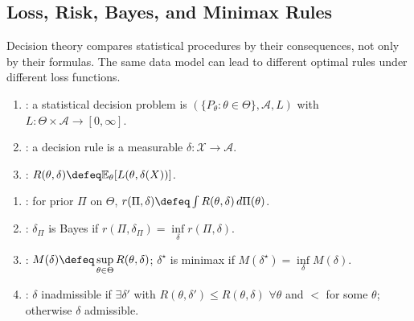 \subsection{Loss, Risk, Bayes, and Minimax Rules}

Decision theory compares statistical procedures by their consequences, not only by their formulas.  The same data model can lead to different optimal rules under different loss functions.

\begin{definition} \label{def:statistical-decision-problem} 
\begin{enumerate}[label=(\roman*)]
\setlength{\itemsep}{0pt}
\item {}: a statistical decision problem is $(\{P_\theta:\theta\in\Theta\},\mathcal{A},L)$ with $L:\Theta\times\mathcal{A}\to[0,\infty]$.
\item {}: a decision rule is a measurable $\delta:\mathcal{X}\to\mathcal{A}$.
\item {}: $R(\theta,\delta)\defeq\mathbb{E}_\theta[L(\theta,\delta(X))]$.
\end{enumerate}
\end{definition}

\begin{definition} \label{def:bayes-risk-minimax-admissible} 
\begin{enumerate}[label=(\roman*)]
\setlength{\itemsep}{0pt}
\item {}: for prior $\Pi$ on $\Theta$, $r(\Pi,\delta)\defeq\int R(\theta,\delta)\,d\Pi(\theta)$.
\item {}: $\delta_\Pi$ is Bayes if $r(\Pi,\delta_\Pi)=\inf\limits_\delta r(\Pi,\delta)$.
\item {}: $M(\delta)\defeq\sup\limits_{\theta\in\Theta}R(\theta,\delta)$; $\delta^\star$ is minimax if $M(\delta^\star)=\inf\limits_\delta M(\delta)$.
\item {}: $\delta$ inadmissible if $\exists\delta'$ with $R(\theta,\delta')\leq R(\theta,\delta)$ $\forall \theta$ and $<$ for some $\theta$; otherwise $\delta$ admissible.
\end{enumerate}
\end{definition}

